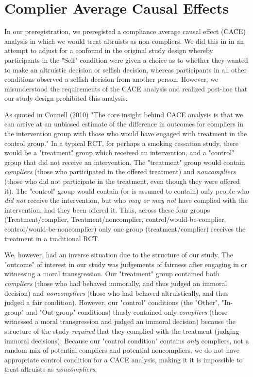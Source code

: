 \documentclass[12pt,]{article}
\begin{document}


\clearpage
\section{Complier Average Causal Effects}
\label{appendix:CACE}

In our preregistration, we preregisted a compliance average causal effect (CACE) analysis in which we would treat altruists as non-compliers. We did this in in an attempt to adjust for a confound in the original study design whereby participants in the "Self" condition were given a choice as to whether they wanted to make an altruistic decision or selfish decision, whereas participants in all other conditions observed a selfish decision from another person. However, we misunderstood the requirements of the CACE analysis and realized post-hoc that our study design prohibited this analysis. 

As quoted in Connell (2010) "The core insight behind CACE analysis is that we can arrive at an unbiased estimate of the difference in outcomes for compliers in the intervention group with those who would have engaged with treatment in the control group." In a typical RCT, for perhaps a smoking cessation study, there would be a "treatment" group which received an intervention, and a "control" group that did not receive an intervention. The "treatment" group would contain \emph{compliers} (those who participated in the offered treatment) and \emph{noncompliers} (those who did not participate in the treatment, even though they were offered it). The "control" group would contain (or is assumed to contain) only people who \emph{did not} receive the intervention, but who \emph{may or may not} have complied with the intervention, had they been offered it. Thus, across these four groups (Treatment/complier, Treatment/noncomplier, control/would-be-complier, control/would-be-noncomplier) only one group (treatment/complier)  receives the treatment in a traditional RCT. 

We, however, had an inverse situation due to the structure of our study. The "outcome" of interest in our study was judgements of fairness after engaging in or witnessing a moral transgression. Our "treatment" group contained both \emph{compliers} (those who had behaved immorally, and thus judged an immoral decision) and \emph{noncompliers} (those who had behaved altruistically, and thus judged a fair condition). However, our "control" conditions (the "Other", "In-group" and "Out-group" conditions) thusly contained only \emph{compliers} (those witnessed a moral transgression and judged an immoral decision) because the structure of the study \emph{required} that they complied with the treatment (judging immoral decisions). Because our "control condition" contains \emph{only} compliers, not a random mix of potential compliers and potential noncompliers, we do not have appropriate control condition for a CACE analysis, making it it is impossible to treat altruists as \emph{noncompliers}. 
\end{document}
